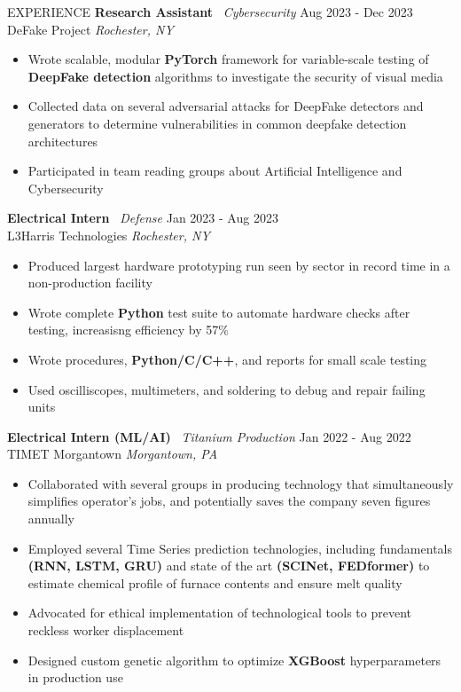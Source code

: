 \documentclass{resume} %
\begin{document}
\begin{rSection}{EXPERIENCE}
\textbf{Research Assistant} \textbar\ \textit{Cybersecurity} \hfill Aug 2023 - Dec 2023\\
DeFake Project \hfill \textit{Rochester, NY}
\begin{itemize}
\itemsep-3pt {}
    \item Wrote scalable, modular \textbf{PyTorch} framework for variable-scale testing of \textbf{DeepFake detection} algorithms to investigate the security of visual media
    \item Collected data on several adversarial attacks for DeepFake detectors and generators to determine vulnerabilities in common deepfake detection architectures
    \item Participated in team reading groups about Artificial Intelligence and Cybersecurity
\end{itemize}

\textbf{Electrical Intern} \textbar\ \textit{Defense} \hfill Jan 2023 - Aug 2023\\
L3Harris Technologies \hfill \textit{Rochester, NY}
\begin{itemize}
\itemsep-3pt {}
    \item Produced largest hardware prototyping run seen by sector in record time in a non-production facility
    \item Wrote complete \textbf{Python} test suite to automate hardware checks after testing, increasisng efficiency by 57\%
    \item Wrote procedures, \textbf{Python/C/C++}, and reports for small scale testing
    \item Used oscilliscopes, multimeters, and soldering to debug and repair failing units
\end{itemize}

    \textbf{Electrical Intern (ML/AI)} \textbar\ \textit{Titanium Production} \hfill Jan 2022 - Aug 2022\\
TIMET Morgantown \hfill \textit{Morgantown, PA}
 \begin{itemize}
    \itemsep-3pt {}
     \item Collaborated with several groups in producing technology that simultaneously simplifies operator’s jobs, and potentially saves the company seven figures annually
     \item Employed several Time Series prediction technologies, including fundamentals \textbf{(RNN, LSTM, GRU)} and state of the art \textbf{(SCINet, FEDformer)} to estimate chemical profile of furnace contents and ensure melt quality
     \item Advocated for ethical implementation of technological tools to prevent reckless worker displacement
     \item Designed custom genetic algorithm to optimize \textbf{XGBoost} hyperparameters in production use
 \end{itemize}

\end{rSection} 
\end{document}

